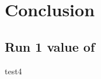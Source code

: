 
\chapter{Conclusion}
\label{chapter:Conclusion}
\thispagestyle{myheadings} %

\section{Run 1 value of \amu}
\label{sec:FinalValue}

test4
